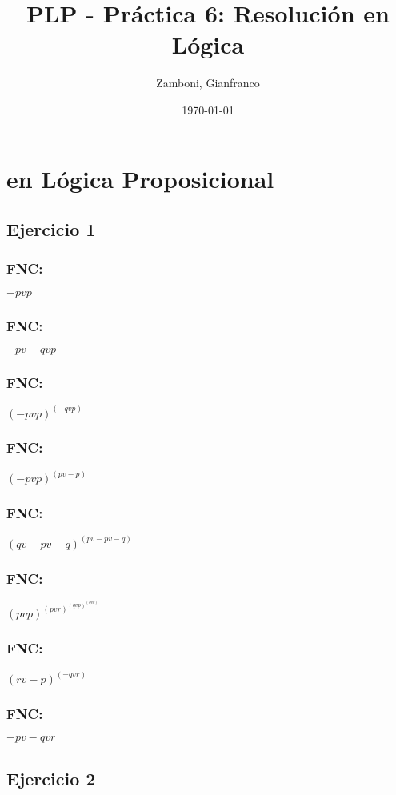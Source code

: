 \documentclass[10pt,a4paper]{article}
\begin{document}
  \title{PLP - Práctica 6: Resolución en Lógica}

  \date{\today}

  \author{Zamboni, Gianfranco}

  \maketitle
  \setcounter{page}{1}

  \section*{ en Lógica Proposicional}
  \subsection{Ejercicio 1}
    \subsubsection{FNC:}
    $-p v p$
    \subsubsection{FNC:}
    $-p v -q v p$
    \subsubsection{FNC:}
    $(-p v p)^(-q v p)$
    \subsubsection{FNC:}
    $(-p v p)^(p v -p)$
    \subsubsection{FNC:}
    $(q v -p v -q)^(p v -p v -q)$
    \subsubsection{FNC:}
    $(p v p)^(p v r)^(q v p)^(q v r)$
    \subsubsection{FNC:}
    $(r v -p)^(-q v r)$
    \subsubsection{FNC:}
    $-p v -q v r$
  \subsection{Ejercicio 2}
\end{document}
